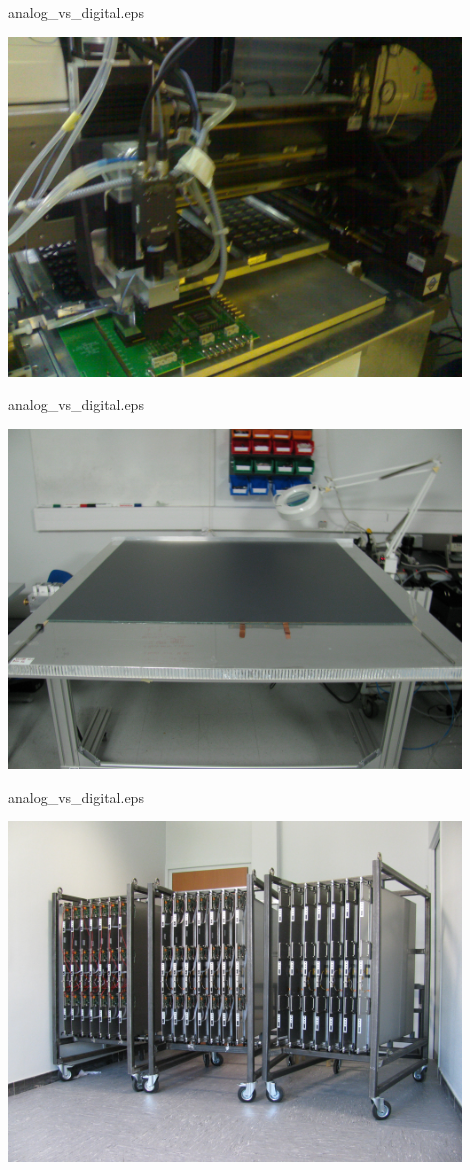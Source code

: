 \begin{frame}{analog\_vs\_digital.eps}
  \centerline{\includegraphics[width=0.9\textwidth]{images/ConstructionGantry}}
\end{frame}
\begin{frame}{analog\_vs\_digital.eps}
  \centerline{\includegraphics[width=0.9\textwidth]{images/ConstructionRPC}}
\end{frame}
\begin{frame}{analog\_vs\_digital.eps}
  \centerline{\includegraphics[width=0.9\textwidth]{images/ConstructionRack}}
\end{frame}
